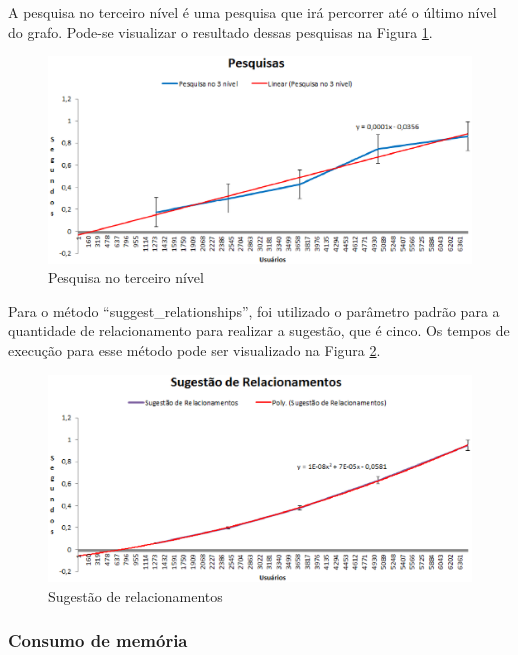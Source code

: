 A pesquisa no terceiro nível é uma pesquisa que irá percorrer até o último nível do grafo. Pode-se visualizar o resultado dessas pesquisas na Figura \ref{pesquisa_3}.

\begin{figure}[!h]
	\centering
	\includegraphics[scale=0.8]{figuras/resultados/graficos/pesquisa_3_nivel.eps}
	\caption[Pesquisas]{Pesquisa no terceiro nível}
	\label{pesquisa_3}
\end{figure}

Para o método ``suggest\_relationships'', foi utilizado o parâmetro padrão para a quantidade de relacionamento para realizar a sugestão, que é cinco. Os tempos de execução para esse método pode ser visualizado na Figura \ref{suggest}.

\begin{figure}[!h]
	\centering
	\includegraphics[scale=0.8]{figuras/resultados/graficos/sugestao_relacionamentos.eps}
	\caption[Sugestão de relacionamentos]{Sugestão de relacionamentos}
	\label{suggest}
\end{figure}

\subsubsection{Consumo de memória}

